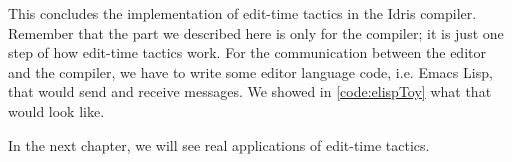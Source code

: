This concludes the implementation of edit-time tactics in the Idris compiler.
Remember that the part we described here is only for the compiler; it is just
one step of how edit-time tactics work. For the communication between the
editor and the compiler, we have to write some editor language code, i.e. Emacs
Lisp, that would send and receive messages. We showed in
\autoref{code:elispToy} what that would look like.

In the next chapter, we will see real applications of edit-time tactics.
